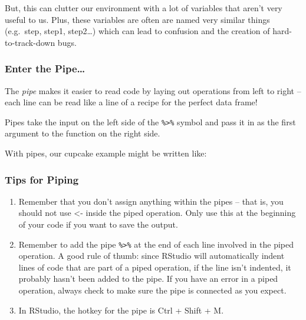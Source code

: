 \documentclass[]{book}
\newenvironment{Shaded}{\begin{snugshade}}{\end{snugshade}}
\newcommand{\KeywordTok}[1]{\textcolor[rgb]{0.13,0.29,0.53}{\textbf{#1}}}
\newcommand{\StringTok}[1]{\textcolor[rgb]{0.31,0.60,0.02}{#1}}
\newcommand{\OperatorTok}[1]{\textcolor[rgb]{0.81,0.36,0.00}{\textbf{#1}}}
\newcommand{\NormalTok}[1]{#1}
\begin{document}
But, this can clutter our environment with a lot of variables that
aren't very useful to us. Plus, these variables are often are named very
similar things (e.g.~step, step1, step2\ldots{}) which can lead to
confusion and the creation of hard-to-track-down bugs.

\subsubsection*{Enter the Pipe\ldots{}}\label{enter-the-pipe}

The \emph{pipe} makes it easier to read code by laying out operations
from left to right -- each line can be read like a line of a recipe for
the perfect data frame!

Pipes take the input on the left side of the \texttt{\%\textgreater{}\%}
symbol and pass it in as the first argument to the function on the right
side.

With pipes, our cupcake example might be written like:

\begin{Shaded}
\end{Shaded}

\subsubsection*{Tips for Piping}\label{tips-for-piping}

\begin{enumerate}
\def\labelenumi{\arabic{enumi}.}
\item
  Remember that you don't assign anything within the pipes -- that is,
  you should not use \textless{}- inside the piped operation. Only use
  this at the beginning of your code if you want to save the output.
\item
  Remember to add the pipe \texttt{\%\textgreater{}\%} at the end of
  each line involved in the piped operation. A good rule of thumb: since
  RStudio will automatically indent lines of code that are part of a
  piped operation, if the line isn't indented, it probably hasn't been
  added to the pipe. If you have an error in a piped operation, always
  check to make sure the pipe is connected as you expect.
\item
  In RStudio, the hotkey for the pipe is Ctrl + Shift + M.
\end{enumerate}
\end{document}
